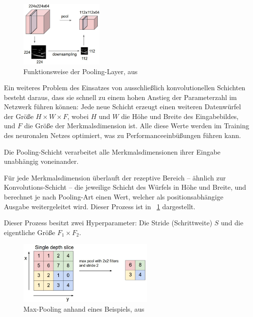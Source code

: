 \begin{figure}[h!]
	\centering
	\includegraphics[width=0.37\textwidth,keepaspectratio]{images/LJY19/pool.jpg}
	\caption{Funktionsweise der Pooling-Layer, aus \cite{cs231n}}
	\label{fig:pooling}
\end{figure}

Ein weiteres Problem des Einsatzes von ausschließlich konvolutionellen Schichten besteht daraus, dass sie schnell zu einem hohen Anstieg der Parameterzahl im Netzwerk führen können: Jede neue Schicht erzeugt einen weiteren Datenwürfel der Größe $H\times W\times F$, wobei $H$ und $W$ die Höhe und Breite des Eingabebildes, und $F$ die Größe der Merkmalsdimension ist. Alle diese Werte werden im Training des neuronalen Netzes optimiert, was zu Performanceeinbüßungen führen kann. \cite{cs231n}

Die Pooling-Schicht verarbeitet alle Merkmalsdimensionen ihrer Eingabe unabhängig voneinander.

Für jede Merkmalsdimension überlauft der rezeptive Bereich -- ähnlich zur Konvolutions-Schicht -- die jeweilige Schicht des Würfels in Höhe und Breite, und berechnet je nach Pooling-Art einen Wert, welcher als positionsabhängige Ausgabe weitergeleitet wird. Dieser Prozess ist in \figurename~\ref{fig:pooling} dargestellt.

Dieser Prozess besitzt zwei Hyperparameter: Die Stride (Schrittweite) $S$ und die eigentliche Größe $F_1\times F_2$. \cite{cs231n}

\begin{figure}[H]
	\centering
	\includegraphics[width=0.6\textwidth,keepaspectratio]{images/LJY19/maxpool.jpg}
	\captionsetup{width=0.6\textwidth}
	\caption{Max-Pooling anhand eines Beispiels, aus \cite{cs231n}}
	\label{fig:maxpooling}
\end{figure}

